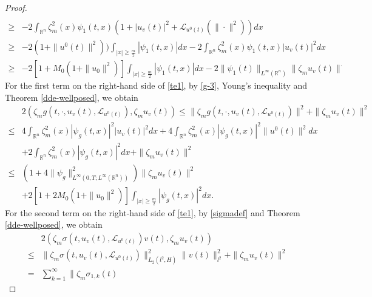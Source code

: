 \documentclass[11pt]{article}
\numberwithin{equation}{section}
\theoremstyle{plain}
\def\geq{\geqslant}
\def\leq{\leqslant}
\begin{document}
\begin{proof}
\begin{align}
           \nonumber \\
  \geq & - 2 \int_{\mathbb{R}^n} \zeta_m^2(x) \psi_1(t,x) (1 +
  |u_v(t)|^2
  +  \mathcal{L}_{u^0(t)}( \|\cdot\|^2) ) dx
           \nonumber \\
  \geq & - 2 (1 + \| u^0(t) \|^2) ) \int_{|x| \geq \frac{m}{2}} |\psi_1(t,x)| dx
   - 2 \int_{\mathbb{R}^n} \zeta_m^2(x) \psi_1(t,x)
  |u_v(t)|^2  dx
           \nonumber \\
  \geq & - 2 \left[ 1 + M_0( 1 + \| u_0 \|^2) \right] \int_{|x| \geq \frac{m}{2}} |\psi_1(t,x)| dx
  - 2 \|
  \psi_1(t)
  \|_{L^\infty(\mathbb{R}^n)}
    \| \zeta_m
   u_v(t)
   \|^.
\end{align}
  For the first term on the right-hand side of \eqref{te1},
 by \eqref{g-3},
 Young's inequality and Theorem \ref{dde-wellposed}, we obtain
\begin{align} \label{te4}
       & 2 \left( \zeta_m g(t, \cdot, u_v(t), \mathcal{L}_{u^0(t)} ), \zeta_m u_v(t) \right)
  \leq  \| \zeta_m g(t, \cdot, u_v(t), \mathcal{L}_{u^0(t)} ) \|^2
         + \| \zeta_m u_v(t) \|^2
            \nonumber \\
  \leq & 4 \int_{\mathbb{R}^n}
                 \zeta^2_m(x) |\psi_g(t,x)|^2
                            \left| u_v(t) \right|^2 dx
         + 4 \int_{\mathbb{R}^n}
                 \zeta^2_m(x) |\psi_g(t,x)|^2 \| u^0(t) \|^2 dx
            \nonumber \\
       & + 2 \int_{\mathbb{R}^n}
                   \zeta^2_m(x) |\psi_g(t,x)|^2 dx
         + \| \zeta_m u_v(t) \|^2
            \nonumber \\
  \leq & \left(1 + 4 \|\psi_g\|_{L^\infty(0,T; L^\infty(\mathbb{R}^n) ) }^2
         \right)
        \| \zeta_m u_v(t) \|^2
            \nonumber \\
       & + 2 \left[ 1+ 2 M_0 \left(1 + \| u_0 \|^2\right)
             \right]
           \int_{|x| \geq \frac{m}{2}} |\psi_g(t,x)|^2 dx.
\end{align}
  For the second term on the right-hand side of \eqref{te1},
 by \eqref{sigmadef} and Theorem \ref{dde-wellposed}, we obtain
\begin{align} \label{te5}
        & 2 \left( \zeta_m \sigma(t, u_v (t), \mathcal{L}_{u^0(t)}) v(t), \zeta_m u_v(t) \right) \nonumber \\
   \leq & \| \zeta_m \sigma(t, u_v (t), \mathcal{L}_{u^0(t)}) \|_{L_2(l^2, H)}^2  \| v(t) \|_{l^2}^2
          + \| \zeta_m u_v(t) \|^2 \nonumber \\
      = & \sum_{k=1}^{\infty}
                       \| \zeta_m \sigma_{1,k} (t)

\end{align}
\end{proof}
\end{document}
